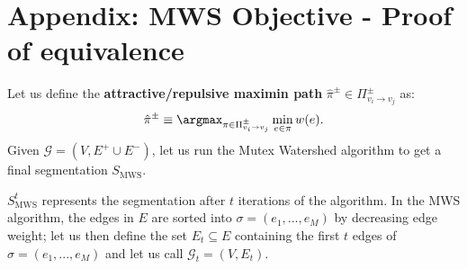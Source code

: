 
\section{Appendix: MWS Objective - Proof of equivalence} \label{sec:proof}

\renewcommand{\labelenumii}{\theenumii} 
\renewcommand{\theenumii}{\theenumi.\arabic{enumii}.}


Let us define the \textbf{attractive/repulsive maximin path} $\hat{\pi}^{\pm}\in\Pi_{v_{i}\rightarrow v_{j}}^{\pm}$
as:
\begin{equation}
\hat{\pi}^{\pm}\equiv\argmax_{\pi\in\Pi_{v_{i}\rightarrow v_{j}}^{\pm}}\min_{e\in\pi}w(e)\label{eq:maximin_path}.
\end{equation}
Given $\mathcal{G}=(V,E^{+}\cup E^{-})$, let us run the Mutex Watershed
algorithm to get a final segmentation $S_{\mathrm{MWS}}$. 

$S_{\mathrm{MWS}}^{t}$
represents the segmentation after $t$ iterations of the algorithm. 
In the MWS algorithm, the edges in $E$ are sorted into $\sigma=(e_{1},...,e_{M})$
by decreasing edge weight; let us then define the set $E_{t}\subseteq E$
containing the first $t$ edges of $\sigma=(e_{1},...,e_{M})$ and
let us call $\mathcal{G}_{t}=(V,E_{t})$. 

